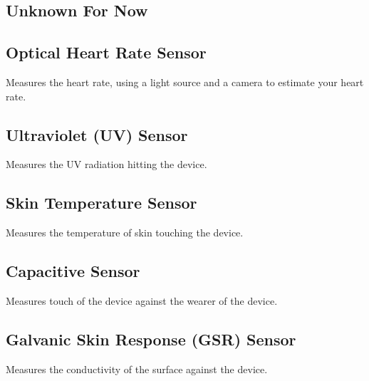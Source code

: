 \subsection{Unknown For Now}
\label{sub:unknown_by_now}

\subsection{Optical Heart Rate Sensor}
\label{sub:optical_heart_rate_sensor}
Measures the heart rate, using a light source and a camera to estimate your heart rate.

\subsection{Ultraviolet (UV) Sensor}
\label{sub:uv_sensor}
Measures the UV radiation hitting the device.

\subsection{Skin Temperature Sensor}
\label{sub:skin_temperature_sensor}
Measures the temperature of skin touching the device.

\subsection{Capacitive Sensor}
\label{sub:capacitive_sensor}
Measures touch of the device against the wearer of the device.

\subsection{Galvanic Skin Response (GSR) Sensor}
\label{sub:galvanic_skin_respons_}
Measures the conductivity of the surface against the device.
